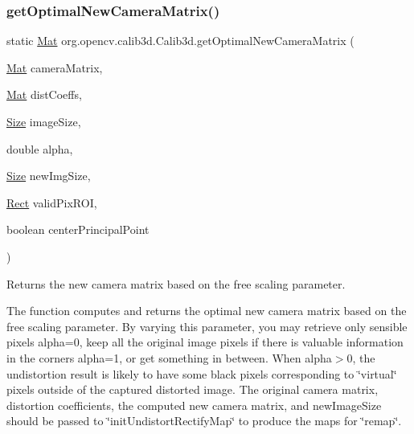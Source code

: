 \subsubsection{\texorpdfstring{get\+Optimal\+New\+Camera\+Matrix()}{getOptimalNewCameraMatrix()}\hspace{0.1cm}{\footnotesize\ttfamily [1/2]}}
{\footnotesize\ttfamily static \mbox{\hyperlink{classorg_1_1opencv_1_1core_1_1_mat}{Mat}} org.\+opencv.\+calib3d.\+Calib3d.\+get\+Optimal\+New\+Camera\+Matrix (\begin{DoxyParamCaption}\item[{\mbox{\hyperlink{classorg_1_1opencv_1_1core_1_1_mat}{Mat}}}]{camera\+Matrix,  }\item[{\mbox{\hyperlink{classorg_1_1opencv_1_1core_1_1_mat}{Mat}}}]{dist\+Coeffs,  }\item[{\mbox{\hyperlink{classorg_1_1opencv_1_1core_1_1_size}{Size}}}]{image\+Size,  }\item[{double}]{alpha,  }\item[{\mbox{\hyperlink{classorg_1_1opencv_1_1core_1_1_size}{Size}}}]{new\+Img\+Size,  }\item[{\mbox{\hyperlink{classorg_1_1opencv_1_1core_1_1_rect}{Rect}}}]{valid\+Pix\+R\+OI,  }\item[{boolean}]{center\+Principal\+Point }\end{DoxyParamCaption})\hspace{0.3cm}{\ttfamily [static]}}

Returns the new camera matrix based on the free scaling parameter.

The function computes and returns the optimal new camera matrix based on the free scaling parameter. By varying this parameter, you may retrieve only sensible pixels {\ttfamily alpha=0}, keep all the original image pixels if there is valuable information in the corners {\ttfamily alpha=1}, or get something in between. When {\ttfamily alpha$>$0}, the undistortion result is likely to have some black pixels corresponding to \char`\"{}virtual\char`\"{} pixels outside of the captured distorted image. The original camera matrix, distortion coefficients, the computed new camera matrix, and {\ttfamily new\+Image\+Size} should be passed to \char`\"{}init\+Undistort\+Rectify\+Map\char`\"{} to produce the maps for \char`\"{}remap\char`\"{}.


